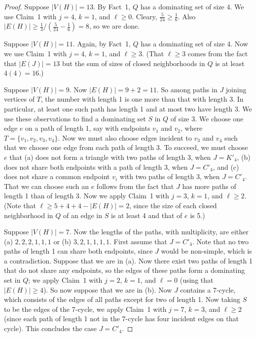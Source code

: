 \documentclass[12pt]{amsart}
\theoremstyle{plain}
\theoremstyle{definition}
\theoremstyle{remark}
\begin{document}
\begin{proof}
Suppose $|V(H)|=13$.  By Fact~1, $Q$ has a dominating set of size 4.
We use Claim~1 with $j=4$, $k=1$, and $\ell\ge 0$.  Cleary, $\frac5{24}\ge
\frac16$.  Also $|E(H)|\ge \frac13/(\frac{5}{24}-\frac16)=8$, so we are
done.

Suppose $|V(H)|=11$. Again, by Fact~1, $Q$ has a dominating set of size 4.
Now we use Claim~1 with $j=4$, $k=1$, and $\ell\ge 3$.
(That $\ell\ge3$ comes from the fact that $|E(J)|=13$ but the sum of sizes
of closed neighborhoods in $Q$ is at least $4(4)=16$.)  

Suppose $|V(H)|=9$.
Now $|E(H)|=9+2=11$. So among paths in $J$ joining vertices of $T$, the number
with length 1 is one more than that with length 3.  In particular, at least one
such path has length 1 and at most two have length 3.
We use these observations to find a dominating set $S$ in $Q$ of size 3.
We choose one edge $e$ on a path of length 1, say with endpoints $v_1$ and $v_2$,
where $T=\{v_1,v_2,v_3,v_4\}$.  Now we must also choose edges incident to $v_3$
and $v_4$ such that we choose one edge from each path of length 3.  To succeed,
we must choose $e$ that (a) does not form a triangle with two paths of length 3,
when $J=K'_4$, (b) does not share both endpoints with a path of length 3, when
$J=C'_4$, and (c) does not share a common endpoint $v_i$ with two paths of
length 3, when $J=C'_4$.  That we can choose such an $e$ follows from the fact
that $J$ has more paths of length 1 than of length 3.  Now we apply Claim~1 with
$j=3$, $k=1$, and $\ell\ge 2$.  (Note that $\ell\ge 5+4+4-|E(H)|=2$, since the
size of each closed neighborhood in $Q$ of an edge in $S$ is at least 4 and that
of $e$ is 5.)

Suppose $|V(H)|=7$.  Now the lengths of the paths, with multiplicity, are either
(a) $2,2,2,1,1,1$ or (b) $3,2,1,1,1,1$.  First assume that $J=C'_4$.  
Note that no two paths of length 1 can share both endpoints, since $J$ would be
non-simple, which is a contradiction.  
Suppose that we are in (a).  Now there
exist two paths of length 1 that do not share any
endpoints, so the edges of these paths form a dominating set in $Q$; we
apply Claim~1 with $j=2$, $k=1$, and $\ell=0$ (using that $|E(H)|\ge 4$).
So now suppose that we are in (b).  Now $J$ contains a 7-cycle, which consists
of the edges of all paths except for two of length 1.  Now taking $S$ to be the
edges of the 7-cycle, we apply Claim~1 with $j=7$, $k=3$, and $\ell\ge 2$
(since each path of length 1 not in the 7-cycle has four incident edges on that
cycle).  This concludes the case $J=C'_4$.


\end{proof}
\end{document}
